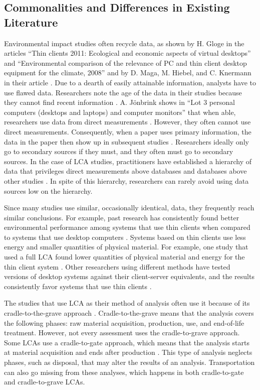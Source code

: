 \documentclass[final,journal,10pt,letterpaper,oneside,twocolumn,compsoc]%
{IEEEtran}
\begin{document}
\subsection{Commonalities and Differences in Existing Literature}
Environmental
impact studies often recycle data, as shown by H. Gloge in the articles ``Thin
clients 2011: Ecological and economic
aspects of virtual desktops'' and ``Environmental comparison of the relevance
of PC and thin client desktop equipment for the climate, 2008'' and by D. Maga,
M. Hiebel, and C. Knermann in their article \cite{client} \cite{desktop2}
\cite{maga}. Due to a dearth of easily attainable information, analysts have to
use flawed data. Researchers note the age of the data in
their studies because they cannot find recent information \cite{maga}
\cite{client}. A. J{\"o}nbrink shows in ``Lot 3 personal computers
(desktops
and laptops) and computer monitors'' that when able, researchers use data from
direct measurements
\cite{desktop}. However, they often cannot use direct measurements.
Consequently,
when a paper uses primary information, the data in the paper then show up
in subsequent studies \cite{maga} \cite{desktop2}. Researchers ideally only
go to secondary sources if they must, and they often must go to secondary
sources. In the case of LCA studies,
practitioners have established a
hierarchy of data that privileges direct measurements above databases and
databases above other studies \cite{textbook}. In spite of this hierarchy,
researchers can rarely avoid using data sources low on the hierarchy.

Since many studies use similar, occasionally identical, data, they
frequently reach similar conclusions. For example, past research has
consistently
found better environmental performance among systems that use thin clients when
compared to systems that use desktop computers \cite{maga} \cite{desktop2}.
Systems based on thin clients use less energy and smaller quantities of physical
material. For example, one study that used a full LCA found
lower quantities of physical material and energy for the thin client system
\cite{maga}.
Other researchers using different methods have tested versions of desktop
systems against
their client-server equivalents, and the results consistently favor
systems that use thin clients \cite{client}.

The studies that use LCA as their method of analysis often use it because of its
cradle-to-the-grave approach \cite{14044}. Cradle-to-the-grave means that the
analysis covers the following phases: raw material acquisition, production, use,
and end-of-life treatment. However, not every assessment uses the
cradle-to-grave approach. Some LCAs use a cradle-to-gate approach, which means
that the
analysis starts at material acquisition and ends after production \cite{14040}.
This type of analysis neglects phases, such as disposal, that may alter the
results of an analysis. Transportation can also go missing from these analyses,
which happens in both cradle-to-gate and cradle-to-grave LCAs.
\end{document}
